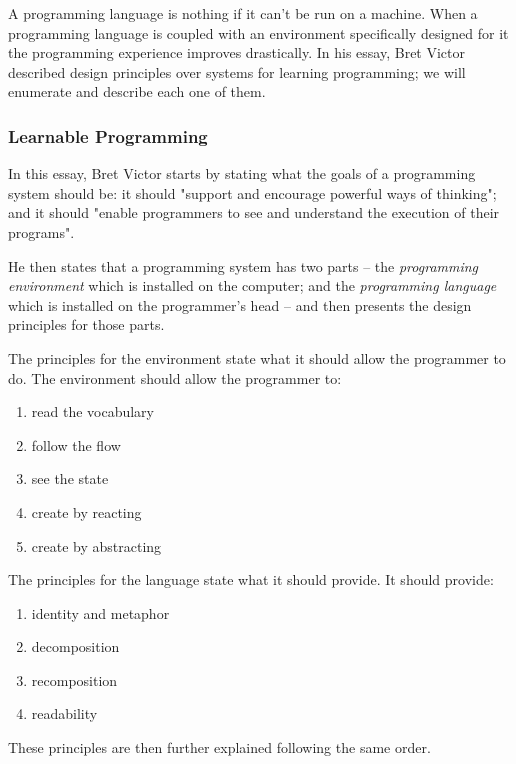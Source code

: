 \documentclass{./llncs2e/llncs}
\begin{document}
A programming language is nothing if it can't be run on a machine. When a programming language is coupled with an environment specifically designed for it the programming experience improves drastically. In his essay\cite{victor2012learnable}, Bret Victor described design principles over systems for learning programming; we will enumerate and describe each one of them.

\subsubsection{Learnable Programming\cite{victor2012learnable}}
In this essay, Bret Victor starts by stating what the goals of a programming system should be: it should "support and encourage powerful ways of thinking"; and it should "enable programmers to see and understand the execution of their programs".

He then states that a programming system has two parts -- the \emph{programming environment} which is installed on the computer; and the \emph{programming language} which is installed on the programmer's head -- and then presents the design principles for those parts.

The principles for the environment state what it should allow the programmer to do. The environment should allow the programmer to:
\begin{enumerate}
	\item \label{lp:env:read} read the vocabulary 
	\item \label{lp:env:flow} follow the flow
	\item \label{lp:env:state} see the state
	\item \label{lp:env:react} create by reacting
	\item \label{lp:env:abstr} create by abstracting
\end{enumerate}

The principles for the language state what it should provide. It should provide:
\begin{enumerate}
	\item \label{lp:lang:id} identity and metaphor
	\item \label{lp:lang:decom} decomposition
	\item \label{lp:lang:recom} recomposition
	\item \label{lp:lang:read} readability
\end{enumerate}

These principles are then further explained following the same order.
\end{document}
